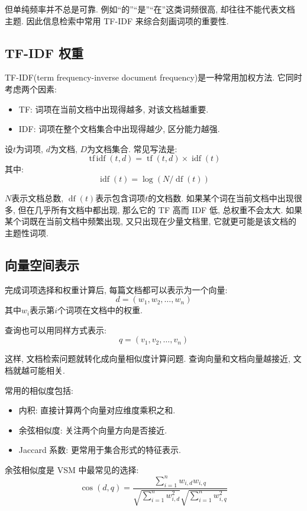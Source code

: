 但单纯频率并不总是可靠.
例如“的”“是”“在”这类词频很高, 却往往不能代表文档主题.
因此信息检索中常用 TF-IDF 来综合刻画词项的重要性.

\subsection{TF-IDF 权重}


TF-IDF(term frequency-inverse document frequency)是一种常用加权方法.
它同时考虑两个因素:

\begin{itemize}
\item TF: 词项在当前文档中出现得越多, 对该文档越重要.
\item IDF: 词项在整个文档集合中出现得越少, 区分能力越强.
\end{itemize}

设$t$为词项, $d$为文档, $D$为文档集合.
常见写法是:
\[
\operatorname{tf\,idf}(t, d)
  = \operatorname{tf}(t, d) \times \operatorname{idf}(t)
\]
其中:
\[
\operatorname{idf}(t) = \log(N / \operatorname{df}(t))
\]

$N$表示文档总数, $\operatorname{df}(t)$表示包含词项$t$的文档数.
如果某个词在当前文档中出现很多, 但在几乎所有文档中都出现,
那么它的 TF 高而 IDF 低, 总权重不会太大.
如果某个词既在当前文档中频繁出现, 又只出现在少量文档里,
它就更可能是该文档的主题性词项.

\subsection{向量空间表示}


完成词项选择和权重计算后, 每篇文档都可以表示为一个向量:
\[
d = (w_1, w_2, \dots, w_n)
\]
其中$w_i$表示第$i$个词项在文档中的权重.

查询也可以用同样方式表示:
\[
q = (v_1, v_2, \dots, v_n)
\]

这样, 文档检索问题就转化成向量相似度计算问题.
查询向量和文档向量越接近, 文档就越可能相关.

常用的相似度包括:

\begin{itemize}
\item 内积: 直接计算两个向量对应维度乘积之和.
\item 余弦相似度: 关注两个向量方向是否接近.
\item Jaccard 系数: 更常用于集合形式的特征表示.
\end{itemize}

余弦相似度是 VSM 中最常见的选择:
\[
\operatorname{cos}(d, q)
  =
  \frac{\sum_{i=1}^n w_{i,d} w_{i,q}}
       {\sqrt{\sum_{i=1}^n w_{i,d}^2}
        \sqrt{\sum_{i=1}^n w_{i,q}^2}}
\]

